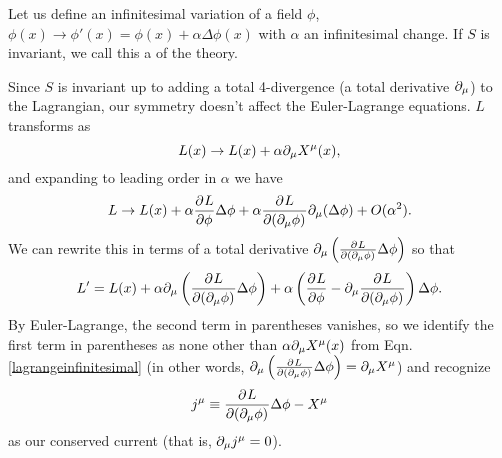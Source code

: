 Let us define an infinitesimal variation of a field $\phi$,
$\phi(x)\to \phi'(x)=\phi(x)+\alpha \Delta \phi(x)$
with $\alpha$ an infinitesimal change. If $S$ is invariant, we call this a  of the theory.

Since $S$ is invariant up to adding a total 4-divergence (a total derivative $\partial_\mu$) to the Lagrangian, our symmetry doesn't affect the Euler-Lagrange equations. $L$ transforms as
\begin{equation}\label{lagrangeinfinitesimal}
L(x)\to L(x)+\alpha \partial_\mu X^\mu(x),
\end{equation}
and expanding to leading order in $\alpha$ we have
\begin{equation}
L\to L(x)+\alpha \frac{\partial^{} L}{\partial \phi ^{}}\Delta \phi +\alpha \frac{\partial^{} L}{\partial (\partial_\mu\phi) ^{}}\partial_\mu(\Delta\phi)+O(\alpha^2).
\end{equation}
We can rewrite this in terms of a total derivative $\partial_\mu\left(\frac{\partial^{} L}{\partial (\partial_\mu\phi) ^{}}\Delta \phi\right)$
so that
\begin{equation}
L'=L(x)+\alpha \partial_\mu\left(\frac{\partial^{} L}{\partial (\partial_\mu\phi) ^{}}\Delta \phi\right) +\alpha \left(\frac{\partial^{} L}{\partial \phi ^{}}-\partial_\mu \frac{\partial^{} L}{\partial (\partial_\mu\phi) ^{}}\right)\Delta \phi.
\end{equation}
By Euler-Lagrange, the second term in parentheses vanishes, so we identify the first term in parentheses as none other than $\alpha \partial_\mu X^\mu(x)$ from Eqn. \ref{lagrangeinfinitesimal} (in other words, $\partial_\mu\left(\frac{\partial^{} L}{\partial (\partial_\mu\phi) ^{}}\Delta \phi\right) =\partial_\mu X^\mu$) and recognize 
\begin{equation}
j^\mu\equiv\frac{\partial^{} L}{\partial (\partial_\mu \phi) ^{}}\Delta \phi -X^\mu
\end{equation} as our conserved current (that is, $\partial_\mu j^\mu =0$).

